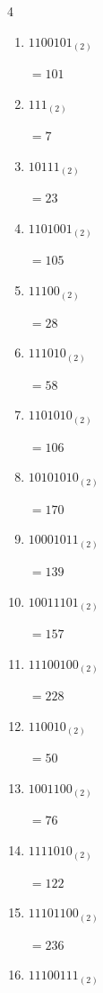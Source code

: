 \begin{multicols}{4}
\begin{enumerate}
        $=219$

\columnbreak %

  \item $1100101_{(2)}$

        $=101$

  \item $111_{(2)}$

        $=7$

  \item $10111_{(2)}$

        $=23$

  \item $1101001_{(2)}$

        $=105$

  \item $11100_{(2)}$

        $=28$

  \item $111010_{(2)}$

        $=58$

  \item $1101010_{(2)}$

        $=106$

  \item $10101010_{(2)}$

        $=170$

  \item $10001011_{(2)}$

        $=139$

  \item $10011101_{(2)}$

        $=157$

  \item $11100100_{(2)}$

        $=228$

  \item $110010_{(2)}$

        $=50$

  \item $1001100_{(2)}$

        $=76$

  \item $1111010_{(2)}$

        $=122$

  \item $11101100_{(2)}$

        $=236$

\columnbreak %

  \item $11100111_{(2)}$


\end{enumerate}
\end{multicols}
